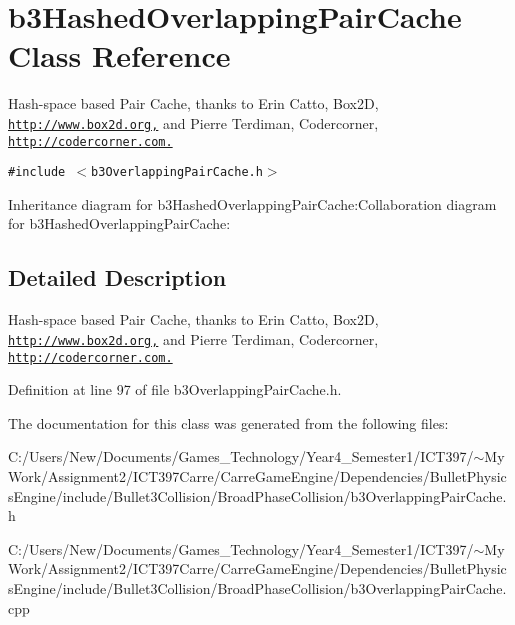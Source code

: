\hypertarget{classb3_hashed_overlapping_pair_cache}{
\section{b3HashedOverlappingPairCache Class Reference}
\label{classb3_hashed_overlapping_pair_cache}
}
Hash-space based Pair Cache, thanks to Erin Catto, Box2D, \href{http://www.box2d.org,}{\tt http://www.box2d.org,} and Pierre Terdiman, Codercorner, \href{http://codercorner.com.}{\tt http://codercorner.com.}  


{\tt \#include $<$b3OverlappingPairCache.h$>$}

Inheritance diagram for b3HashedOverlappingPairCache:Collaboration diagram for b3HashedOverlappingPairCache:

\subsection{Detailed Description}
Hash-space based Pair Cache, thanks to Erin Catto, Box2D, \href{http://www.box2d.org,}{\tt http://www.box2d.org,} and Pierre Terdiman, Codercorner, \href{http://codercorner.com.}{\tt http://codercorner.com.} 

Definition at line 97 of file b3OverlappingPairCache.h.

The documentation for this class was generated from the following files:\begin{CompactItemize}
\item 
C:/Users/New/Documents/Games\_\-Technology/Year4\_\-Semester1/ICT397/$\sim$My Work/Assignment2/ICT397Carre/CarreGameEngine/Dependencies/BulletPhysicsEngine/include/Bullet3Collision/BroadPhaseCollision/b3OverlappingPairCache.h\item 
C:/Users/New/Documents/Games\_\-Technology/Year4\_\-Semester1/ICT397/$\sim$My Work/Assignment2/ICT397Carre/CarreGameEngine/Dependencies/BulletPhysicsEngine/include/Bullet3Collision/BroadPhaseCollision/b3OverlappingPairCache.cpp\end{CompactItemize}
